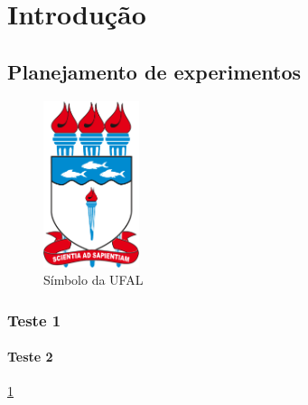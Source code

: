 \chapter{Introdução}
\label{chap:introdução}

\section{Planejamento de experimentos}
\label{sec:Exemplo de imagem}

\begin{figure}[!hbt]
	\centering
	\caption{Símbolo da UFAL}
	\label{fig:1_possuem_celular}
	\includegraphics[width=0.25\textwidth]{imagens/ufal}
\end{figure}


\subsection{Teste 1}

\subsubsection{Teste 2}

\ref{chap:introdução}